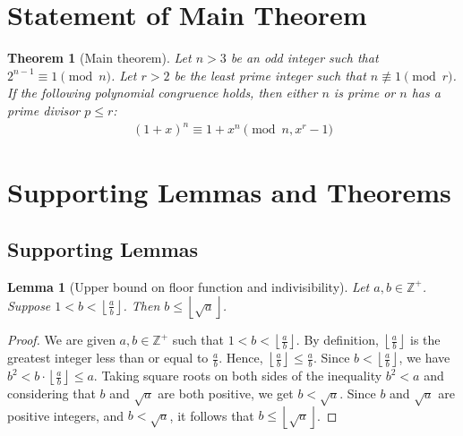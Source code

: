 \documentclass{article}
\theoremstyle{plain}
\theoremstyle{definition}
\newtheorem{theorem}{Theorem}
\newtheorem{lemma}{Lemma}
\newcommand{\Z}{\mathbb{Z}}
\newcommand{\D}{r}
\begin{document}
\section{Statement of Main Theorem}
\begin{theorem}[Main theorem] \label{theorem:main}
\textit{Let $n > 3$ be an odd integer such that $2^{n-1} \equiv 1 \pmod{n}$. Let $\D > 2$ be the least prime integer such that $n \not\equiv 1 \pmod{\D}$. If the following polynomial congruence holds, then either $n$ is prime or $n$ has a prime divisor $p \leq \D$:}
\begin{align}
(1 + x)^n \equiv 1 + x^n \pmod{n, x^\D - 1}
\end{align}
\end{theorem}

\section{Supporting Lemmas and Theorems}

\subsection{Supporting Lemmas}

\begin{lemma}[Upper bound on floor function and indivisibility]
\label{lemma:floornondivisorupperbound}
\textit{Let $a,b \in \Z^{+}$. Suppose \( 1 < b < \left\lfloor \frac{a}{b} \right\rfloor \). Then \(b \leq \left\lfloor \sqrt{a} \right\rfloor\).}
\end{lemma}
\begin{proof}
We are given \( a, b \in \Z^{+} \) such that \( 1 < b < \left\lfloor \frac{a}{b} \right\rfloor \). By definition, \( \left\lfloor \frac{a}{b} \right\rfloor \) is the greatest integer less than or equal to \( \frac{a}{b} \). Hence, \( \left\lfloor \frac{a}{b} \right\rfloor \leq \frac{a}{b} \). Since \( b < \left\lfloor \frac{a}{b} \right\rfloor \), we have \( b^2 < b \cdot \left\lfloor \frac{a}{b} \right\rfloor \leq a \). Taking square roots on both sides of the inequality \( b^2 < a \) and considering that \( b \) and \( \sqrt{a} \) are both positive, we get \( b < \sqrt{a} \). Since \( b \) and \( \sqrt{a} \) are positive integers, and \( b < \sqrt{a} \), it follows that \( b \leq \left\lfloor \sqrt{a} \right\rfloor \).
\end{proof}
\end{document}
